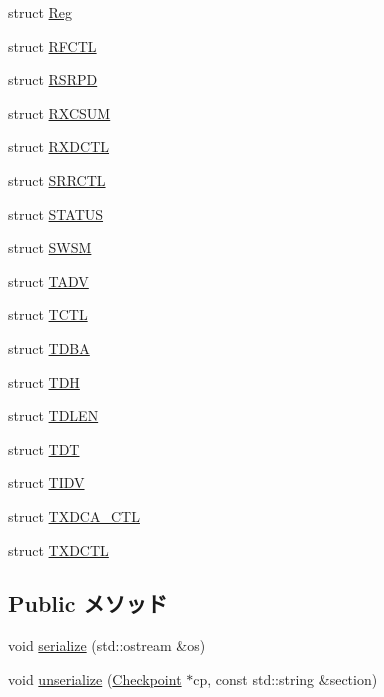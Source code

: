 \begin{DoxyCompactItemize}
\item 
struct \hyperlink{structiGbReg_1_1Regs_1_1Reg}{Reg}
\item 
struct \hyperlink{structiGbReg_1_1Regs_1_1RFCTL}{RFCTL}
\item 
struct \hyperlink{structiGbReg_1_1Regs_1_1RSRPD}{RSRPD}
\item 
struct \hyperlink{structiGbReg_1_1Regs_1_1RXCSUM}{RXCSUM}
\item 
struct \hyperlink{structiGbReg_1_1Regs_1_1RXDCTL}{RXDCTL}
\item 
struct \hyperlink{structiGbReg_1_1Regs_1_1SRRCTL}{SRRCTL}
\item 
struct \hyperlink{structiGbReg_1_1Regs_1_1STATUS}{STATUS}
\item 
struct \hyperlink{structiGbReg_1_1Regs_1_1SWSM}{SWSM}
\item 
struct \hyperlink{structiGbReg_1_1Regs_1_1TADV}{TADV}
\item 
struct \hyperlink{structiGbReg_1_1Regs_1_1TCTL}{TCTL}
\item 
struct \hyperlink{structiGbReg_1_1Regs_1_1TDBA}{TDBA}
\item 
struct \hyperlink{structiGbReg_1_1Regs_1_1TDH}{TDH}
\item 
struct \hyperlink{structiGbReg_1_1Regs_1_1TDLEN}{TDLEN}
\item 
struct \hyperlink{structiGbReg_1_1Regs_1_1TDT}{TDT}
\item 
struct \hyperlink{structiGbReg_1_1Regs_1_1TIDV}{TIDV}
\item 
struct \hyperlink{structiGbReg_1_1Regs_1_1TXDCA__CTL}{TXDCA\_\-CTL}
\item 
struct \hyperlink{structiGbReg_1_1Regs_1_1TXDCTL}{TXDCTL}
\end{DoxyCompactItemize}
\subsection*{Public メソッド}
\begin{DoxyCompactItemize}
\item 
void \hyperlink{structiGbReg_1_1Regs_a53e036786d17361be4c7320d39c99b84}{serialize} (std::ostream \&os)
\item 
void \hyperlink{structiGbReg_1_1Regs_af22e5d6d660b97db37003ac61ac4ee49}{unserialize} (\hyperlink{classCheckpoint}{Checkpoint} $\ast$cp, const std::string \&section)
\end{DoxyCompactItemize}
